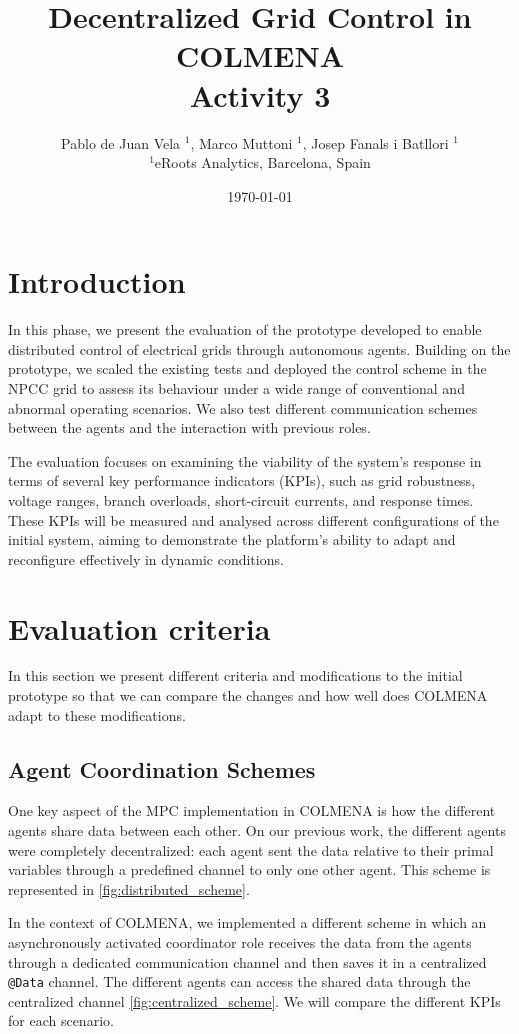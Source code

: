 \documentclass{article}
\title{Decentralized Grid Control in COLMENA \\ Activity 3}
\author{Pablo de Juan Vela $^{1}$, Marco Muttoni $^{1}$, Josep Fanals i Batllori $^{1}$ \\
        \small $^{1}$eRoots Analytics, Barcelona, Spain \\
}
\date{\today}
\begin{document}
\maketitle
\section{Introduction}

In this phase, we present the evaluation of the prototype developed to enable distributed control of electrical grids through autonomous agents. Building on the prototype, we scaled the existing tests and deployed the control scheme in the NPCC grid \cite{grids:npcc} to assess its behaviour under a wide range of conventional and abnormal operating scenarios. We also test different communication schemes between the agents and the interaction with previous roles.

The evaluation focuses on examining the viability of the system’s response in terms of several key performance indicators (KPIs), such as grid robustness, voltage ranges, branch overloads, short-circuit currents, and response times. These KPIs will be measured and analysed across different configurations of the initial system, aiming to demonstrate the platform’s ability to adapt and reconfigure effectively in dynamic conditions.

\section{Evaluation criteria}

In this section we present different criteria and modifications to the initial prototype so that we can compare the changes and how well does COLMENA adapt to these modifications.

\subsection{Agent Coordination Schemes}

One key aspect of the MPC implementation in COLMENA is how the different agents share data between each other. On our previous work, the different agents were completely decentralized: each agent sent the data relative to their primal variables through a predefined channel to only one other agent. This scheme is represented in \ref{fig:distributed_scheme}. 

In the context of COLMENA, we implemented a different scheme in which an asynchronously activated coordinator role receives the data from the agents through a dedicated communication channel and then saves it in a centralized \texttt{@Data} channel. The  different agents can access the shared data through the centralized channel \ref{fig:centralized_scheme}. We will compare the different KPIs for each scenario.
\end{document}
